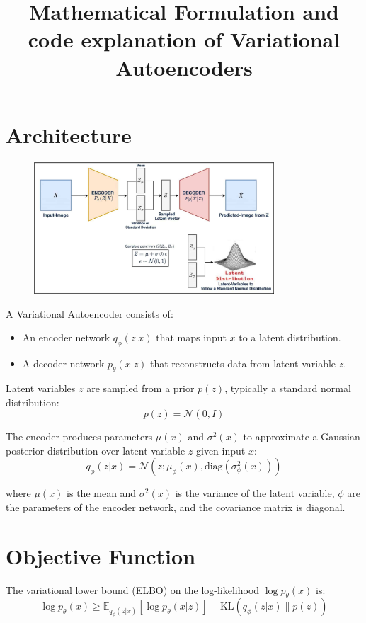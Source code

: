 \documentclass{article}
\title{Mathematical Formulation and code explanation of Variational Autoencoders}
\begin{document}
\maketitle

\section*{Architecture}

\begin{figure}[H]
    \centering
    \includegraphics[width=0.8\textwidth]{arch.jpg}
\end{figure}

A Variational Autoencoder consists of:
\begin{itemize}
    \item An encoder network $q_{\phi}(z|x)$ that maps input $x$ to a latent distribution.
    \item A decoder network $p_{\theta}(x|z)$ that reconstructs data from latent variable $z$.
\end{itemize}

Latent variables $z$ are sampled from a prior $p(z)$, typically a standard normal distribution:
\[
p(z) = \mathcal{N}(0, I)
\]

The encoder produces parameters $\mu(x)$ and $\sigma^2(x)$ to approximate a Gaussian posterior distribution over latent variable $z$ given input $x$:
\[
q_{\phi}(z|x) = \mathcal{N}(z; \mu_{\phi}(x), \mathrm{diag}(\sigma^2_{\phi}(x)))
\]

where $\mu(x)$ is the mean and $\sigma^2(x)$ is the variance of the latent variable, $\phi$ are the parameters of the encoder network, and the covariance matrix is diagonal.

\section*{Objective Function}

The variational lower bound (ELBO) on the log-likelihood $\log p_{\theta}(x)$ is:
\[
\log p_{\theta}(x) \geq \mathbb{E}_{q_{\phi}(z|x)}[\log p_{\theta}(x|z)] - \mathrm{KL}(q_{\phi}(z|x) \| p(z))
\]
\end{document}
